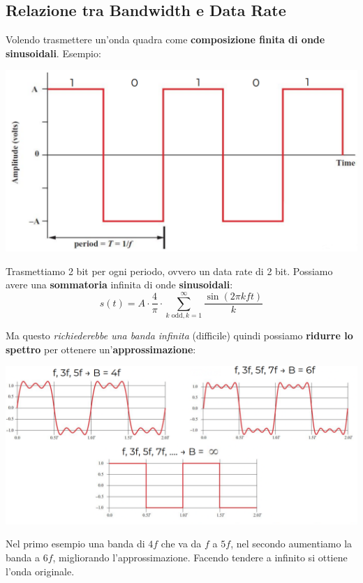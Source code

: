 \subsection{Relazione tra Bandwidth e Data Rate}

Volendo trasmettere un'onda quadra come \textbf{composizione finita di onde sinusoidali}. Esempio:
\begin{center}
	\includegraphics[width=0.7\linewidth]{img/PTT/quadra1}
\end{center}

Trasmettiamo 2 bit per ogni periodo, ovvero un data rate di 2 bit. Possiamo avere una \textbf{sommatoria} infinita di onde \textbf{sinusoidali}: 
$$ s(t) = A \cdot \frac{4}{\pi} \cdot \sum_{k \text{ odd}, k=1}^{\infty} \frac{\sin (2 \pi kft)}{k} $$

Ma questo \textit{richiederebbe una banda infinita} (difficile) quindi possiamo \textbf{ridurre lo spettro} per ottenere un'\textbf{approssimazione}: 
\begin{center}
	\includegraphics[width=\linewidth]{img/PTT/fourier1m}
\end{center}

Nel primo esempio una banda di $4f$ che va da $f$ a $5f$, nel secondo aumentiamo la banda a $6f$, migliorando l'approssimazione. Facendo tendere a infinito si ottiene l'onda originale.

